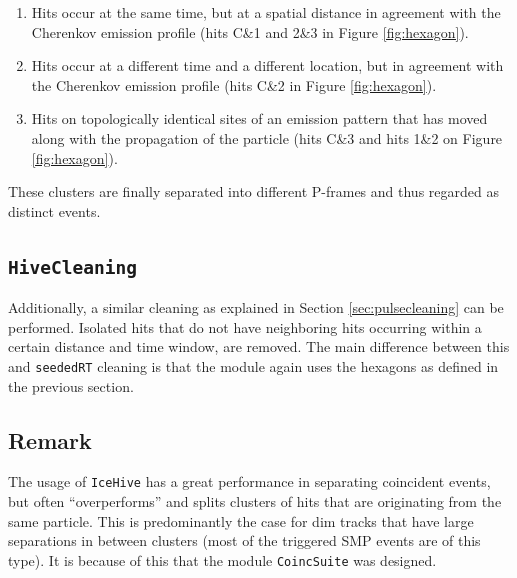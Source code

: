 \begin{enumerate}
\item Hits occur at the same time, but at a spatial distance in agreement with the Cherenkov emission profile (hits C\&1 and 2\&3 in Figure \ref{fig:hexagon}).
\item Hits occur at a different time and a different location, but in agreement with the Cherenkov emission profile (hits C\&2 in Figure \ref{fig:hexagon}).
\item Hits on topologically identical sites of an emission pattern that has moved along with the propagation of the particle (hits C\&3 and hits 1\&2 on Figure \ref{fig:hexagon}).
\end{enumerate}
These clusters are finally separated into different P-frames and thus regarded as distinct events.

\subsection{\texttt{HiveCleaning}}
Additionally, a similar cleaning as explained in Section \ref{sec:pulsecleaning} can be performed. Isolated hits that do not have neighboring hits occurring within a certain distance and time window, are removed. The main difference between this and \texttt{seededRT} cleaning is that the module again uses the hexagons as defined in the previous section.\\

\subsection{Remark}
\noindent The usage of \texttt{IceHive} has a great performance in separating coincident events, but often ``overperforms'' and splits clusters of hits that are originating from the same particle. This is predominantly the case for dim tracks that have large separations in between clusters (most of the triggered SMP events are of this type). It is because of this that the module \texttt{CoincSuite}  was designed.

